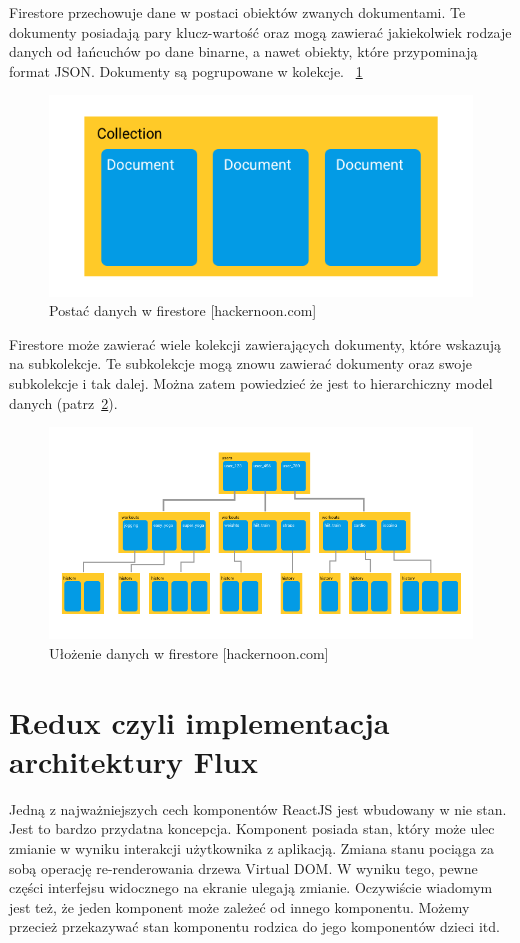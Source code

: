 Firestore przechowuje dane w postaci obiektów zwanych dokumentami.
Te dokumenty posiadają pary klucz-wartość oraz mogą zawierać jakiekolwiek rodzaje danych
od łańcuchów po dane binarne, a nawet obiekty, które przypominają format JSON\@.
Dokumenty są pogrupowane w kolekcje.
~\ref{rys:firestoreData}

\begin{figure}
	\centering\includegraphics[width=.6\textwidth]{img/firestoreData.png}
	\caption{Postać danych w firestore [hackernoon.com]}\label{rys:firestoreData}%
\end{figure}

Firestore może zawierać wiele kolekcji zawierających dokumenty, które wskazują na subkolekcje.
Te subkolekcje mogą znowu zawierać dokumenty oraz swoje subkolekcje i tak dalej.
Można zatem powiedzieć że jest to hierarchiczny model danych (patrz~\ref{rys:firestoreTree}).
~\cite{www_hakermoon}

\begin{figure}
	\centering\includegraphics[width=.6\textwidth]{img/firestoreTree.png}
	\caption{Ułożenie danych w firestore [hackernoon.com]}\label{rys:firestoreTree}%
\end{figure}

\section{Redux czyli implementacja architektury Flux}

Jedną z najważniejszych cech komponentów ReactJS jest wbudowany w nie stan.
Jest to bardzo przydatna koncepcja. Komponent posiada stan,
który może ulec zmianie w wyniku interakcji użytkownika z aplikacją.
Zmiana stanu pociąga za sobą operację re-renderowania drzewa Virtual DOM\@.
W wyniku tego, pewne części interfejsu widocznego na ekranie ulegają zmianie.
Oczywiście wiadomym jest też, że jeden komponent może zależeć od innego komponentu.
Możemy przecież przekazywać stan komponentu rodzica do jego komponentów dzieci itd.

